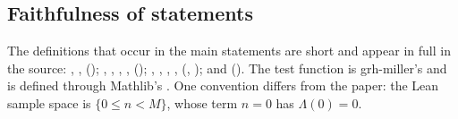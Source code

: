 \subsection{Faithfulness of statements}
The definitions that occur in the main statements are short and appear in full in the source:
, ,  (); , ,
, ,  (); , , , ,
 (, ); and  (). The test
function  is grh-miller's and is defined through Mathlib's . One
convention differs from the paper: the Lean sample space is $\{0\le n<M\}$, whose term $n=0$ has $\Lambda(0)=0$.
